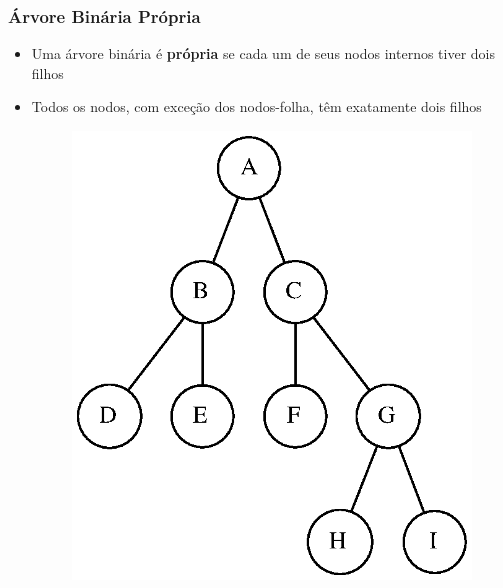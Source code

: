 \documentclass[aspectratio=169]{beamer}
\begin{document}
\begin{frame}[fragile]\frametitle{Árvore Binária Própria}
\begin{itemize}
	\item Uma árvore binária é \textbf{própria} se cada um de seus nodos internos tiver dois filhos
	\item Todos os nodos, com exceção dos nodos-folha, têm exatamente dois filhos
\begin{figure}[h]
	\centering
	\includegraphics[height=0.5\paperheight]{imagens/arvore_binaria02.eps}
\end{figure}
\end{itemize}
\end{frame}
\end{document}
